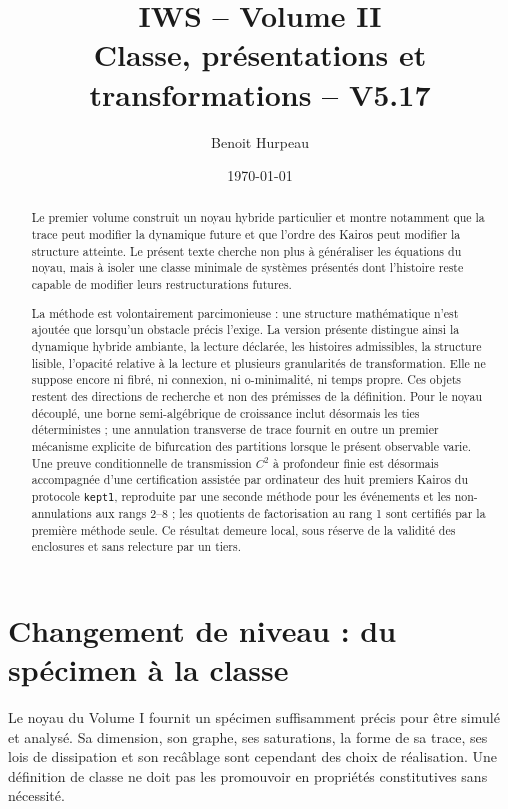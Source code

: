 \documentclass[11pt,a4paper]{article}
\title{\textbf{IWS -- Volume II}\\[0.4em]\large Classe, présentations et transformations -- V5.17}
\author{Benoit Hurpeau}
\date{\today}
\theoremstyle{definition}
\theoremstyle{remark}
\begin{document}
\maketitle

\begin{abstract}
Le premier volume construit un noyau hybride particulier et montre notamment que la trace peut modifier la dynamique future et que l'ordre des Kairos peut modifier la structure atteinte. Le présent texte cherche non plus à généraliser les équations du noyau, mais à isoler une classe minimale de systèmes présentés dont l'histoire reste capable de modifier leurs restructurations futures.

La méthode est volontairement parcimonieuse : une structure mathématique n'est ajoutée que lorsqu'un obstacle précis l'exige. La version présente distingue ainsi la dynamique hybride ambiante, la lecture déclarée, les histoires admissibles, la structure lisible, l'opacité relative à la lecture et plusieurs granularités de transformation. Elle ne suppose encore ni fibré, ni connexion, ni o-minimalité, ni temps propre. Ces objets restent des directions de recherche et non des prémisses de la définition. Pour le noyau découplé, une borne semi-algébrique de croissance inclut désormais les ties déterministes ; une annulation transverse de trace fournit en outre un premier mécanisme explicite de bifurcation des partitions lorsque le présent observable varie. Une preuve conditionnelle de transmission $C^2$ à profondeur finie est désormais accompagnée d'une certification assistée par ordinateur des huit premiers Kairos du protocole \texttt{kept1}, reproduite par une seconde méthode pour les événements et les non-annulations aux rangs 2--8 ; les quotients de factorisation au rang 1 sont certifiés par la première méthode seule. Ce résultat demeure local, sous réserve de la validité des enclosures et sans relecture par un tiers.
\end{abstract}

\section{Changement de niveau : du spécimen à la classe}

Le noyau du Volume I fournit un spécimen suffisamment précis pour être simulé et analysé. Sa dimension, son graphe, ses saturations, la forme de sa trace, ses lois de dissipation et son recâblage sont cependant des choix de réalisation. Une définition de classe ne doit pas les promouvoir en propriétés constitutives sans nécessité.
\end{document}
